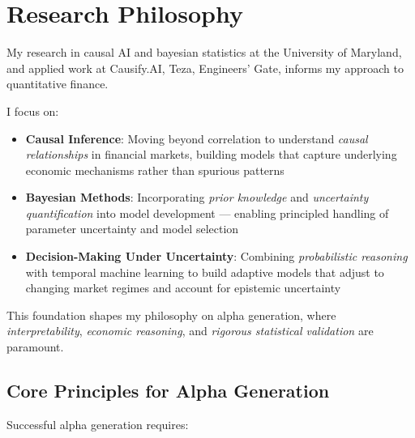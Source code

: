 \documentclass[11pt, letterpaper]{article}
\begin{document}
  \section{Research Philosophy}
  \label{research-philosophy}

  My research in causal AI and bayesian statistics at the University of
  Maryland, and applied work at Causify.AI, Teza, Engineers' Gate, informs my
  approach to quantitative finance.

  I focus on:

  \begin{itemize}
    \item \textbf{Causal Inference}: Moving beyond correlation to understand
      \textit{causal relationships} in financial markets, building models
      that capture underlying economic mechanisms rather than spurious
      patterns

    \item \textbf{Bayesian Methods}: Incorporating \textit{prior knowledge}
      and \textit{uncertainty quantification} into model development ---
      enabling principled handling of parameter uncertainty and model
      selection

    \item \textbf{Decision-Making Under Uncertainty}: Combining
      \textit{probabilistic reasoning} with temporal machine learning to
      build adaptive models that adjust to changing market regimes and
      account for epistemic uncertainty
  \end{itemize}

  This foundation shapes my philosophy on alpha generation, where
  \textit{interpretability}, \textit{economic reasoning}, and \textit{rigorous
  statistical validation} are paramount.

  \subsection{Core Principles for Alpha Generation}
  \label{core-principles-for-alpha-generation}

  Successful alpha generation requires:
\end{document}
